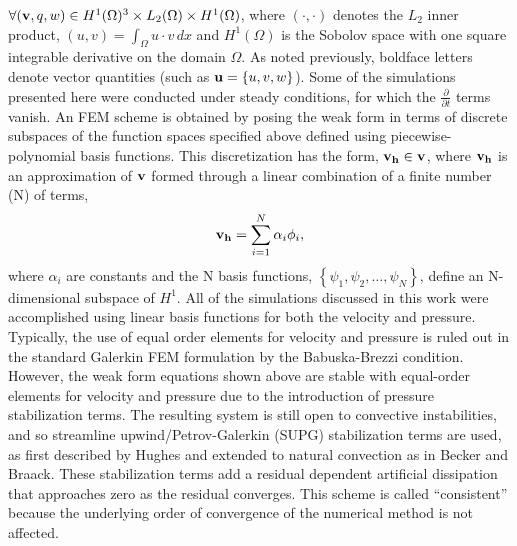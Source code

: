 $\forall ({\bf v},q,w) \in H^1(\Omega)^3 \times L_2(\Omega) \times
H^1(\Omega)$, where $(\cdot,\cdot)$ denotes the $L_2$ inner product, 
$(u,v) = \int_\Omega u \cdot v \, dx$ and $H^1(\Omega)$ is the
Sobolov space with one square integrable derivative on the domain
$\Omega$\cite{oden2012introduction}. As noted previously, boldface letters
denote vector quantities (such as ${\bf u} = \left \{ u,v,w \right \}$). 
Some of the simulations presented here were conducted under
steady conditions, for which the $\frac{\partial}{\partial t}$ terms
vanish. An FEM scheme is obtained by posing the weak form in
terms of discrete subspaces of the function spaces specified above
defined using piecewise-polynomial basis functions. This discretization
has the form, $ {\bf v_h} \in {\bf v}$, where ${\bf v_h}$ is an
approximation of ${\bf v}$ formed through a linear combination of a
finite number (N) of terms,  
\begin{equation}
 {\bf v_h} = \sum_{i=1}^N \alpha_i \phi_i,
\end{equation}
where $\alpha_i$ are constants and the N basis functions, $\left \{
\psi_1, \psi_2, \ldots, \psi_N \right \}$, define an N-dimensional 
subspace of $H^1$\cite{becker1981introduction}. All of the simulations
discussed in this work were 
accomplished using linear basis functions for both the velocity and
pressure. Typically, the use of equal order elements for velocity and
pressure is ruled out in the standard Galerkin FEM formulation by the
Babuska-Brezzi condition\cite{bb-cond}. 
However, the weak form equations shown above are stable with equal-order
elements for velocity and pressure due to the introduction of pressure
stabilization terms. The resulting system is still open to convective
instabilities, and so streamline upwind/Petrov-Galerkin (SUPG)
stabilization terms are used, as first described by
Hughes\cite{Hughes198685,supg} and extended to natural convection as in
Becker and Braack\cite{Becker2002428}. These stabilization terms add 
a residual dependent artificial dissipation that approaches zero as the
residual converges. This scheme is called ``consistent'' because the
underlying order of convergence of the numerical method is not
affected\cite{hughes2000finite}.   

